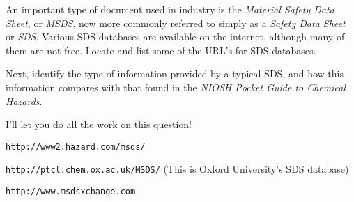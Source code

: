 

An important type of document used in industry is the {\it Material Safety Data Sheet}, or {\it MSDS}, now more commonly referred to simply as a {\it Safety Data Sheet} or {\it SDS}.  Various SDS databases are available on the internet, although many of them are not free.  Locate and list some of the URL's for SDS databases.

\vskip 10pt

Next, identify the type of information provided by a typical SDS, and how this information compares with that found in the {\it NIOSH Pocket Guide to Chemical Hazards}.







I'll let you do all the work on this question!







{\tt http://www2.hazard.com/msds/}

\vskip 10pt

{\tt http://ptcl.chem.ox.ac.uk/MSDS/} (This is Oxford University's SDS database)

\vskip 10pt

{\tt http://www.msdsxchange.com} 




